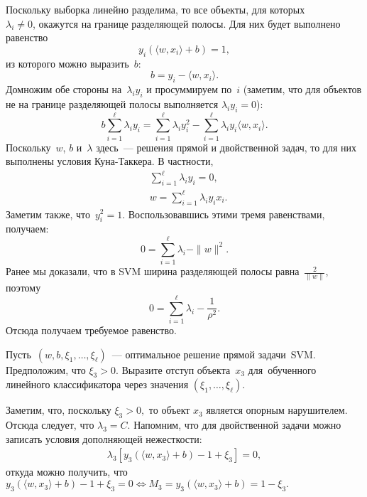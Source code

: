 \documentclass[12pt,fleqn]{article}
\begin{document}
\begin{esSolution}
    Поскольку выборка линейно разделима, то все объекты, для которых \\ $\lambda_i \neq 0$,
    окажутся на границе разделяющей полосы.
    Для них будет выполнено равенство
    \[
        y_i \left(\langle w, x_i \rangle + b \right) = 1,
    \]
    из которого можно выразить~$b$:
    \[
        b = y_i - \langle w, x_i \rangle.
    \]
    Домножим обе стороны на~$\lambda_i y_i$ и просуммируем по~$i$ (заметим, что для объектов не на границе разделяющей полосы выполняется $\lambda_i y_i = 0$):
    \[
        b \sum_{i = 1}^{\ell} \lambda_i y_i
        =
        \sum_{i = 1}^{\ell} \lambda_i y_i^2
        -
        \sum_{i = 1}^{\ell} \lambda_i y_i \langle w, x_i \rangle.
    \]
    Поскольку~$w$, $b$ и~$\lambda$ здесь~--- решения прямой и двойственной задач,
    то для них выполнены условия Куна-Таккера.
    В частности,
    \begin{align*}
        & \sum_{i = 1}^{\ell} \lambda_i y_i = 0,\\
        & w = \sum_{i = 1}^{\ell} \lambda_i y_i x_i.
    \end{align*}
    Заметим также, что~$y_i^2 = 1$.
    Воспользовавшись этими тремя равенствами, получаем:
    \[
        0
        =
        \sum_{i = 1}^{\ell} \lambda_i
        -
        \|w\|^2.
    \]
    Ранее мы доказали, что в SVM ширина разделяющей полосы равна~$\frac{2}{\|w\|}$, поэтому
    \[
        0
        =
        \sum_{i = 1}^{\ell} \lambda_i
        -
        \frac{1}{\rho^2}.
    \]
    Отсюда получаем требуемое равенство.
\end{esSolution}

\begin{vkProblem}
	Пусть~$(w, b, \xi_1, \dots, \xi_{\ell})$~---
	оптимальное решение прямой задачи~SVM.
	Предположим, что $\xi_3 > 0$.
	Выразите отступ объекта~$x_3$ для~обученного линейного классификатора
	через значения $(\xi_1, \dots, \xi_{\ell})$.
\end{vkProblem}

\begin{esSolution}
	Заметим, что, поскольку $\xi_3 >0,$ то объект $x_3$ является опорным нарушителем. Отсюда следует, что $\lambda_3 = C.$ Напомним, что для двойственной задачи можно записать условия дополняющей нежесткости:
	\begin{align*}
		\lambda_3 [y_3 \left( \langle w, x_3\rangle + b  \right) - 1 + \xi_3] = 0,
	\end{align*}
	откуда можно получить, что $y_3 \left( \langle w, x_3\rangle + b \right) - 1 + \xi_3 = 0 \Leftrightarrow M_3 = y_3 \left( \langle w, x_3\rangle + b  \right) = 1 - \xi_3.$
\end{esSolution}
\end{document}
